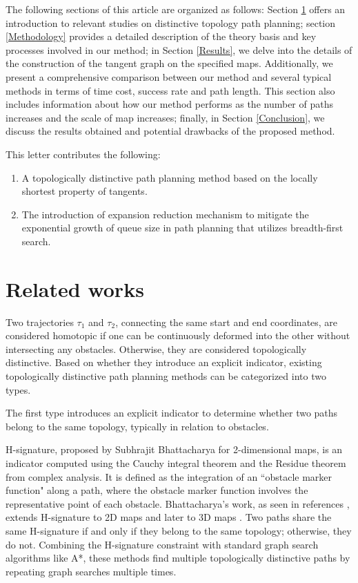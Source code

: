 \documentclass[lettersize,journal]{IEEEtran}
\begin{document}
The following sections of this article are organized as follows: Section \ref{RelatedWork} offers an introduction to relevant studies on distinctive topology path planning; section \ref{Methodology} provides a detailed description of the theory basis and key processes involved in our method; in Section \ref{Results}, we delve into the details of the construction of the tangent graph on the specified maps. Additionally, we present a comprehensive comparison between our method and several typical methods in terms of time cost, success rate and path length. This section also includes information about how our method performs as the number of paths increases and the scale of map increases; finally, in Section \ref{Conclusion}, we discuss the results obtained and potential drawbacks of the proposed method.

This letter contributes the following:

\begin{enumerate}
    \item A topologically distinctive path planning method based on the locally shortest property of tangents.
    \item The introduction of expansion reduction mechanism to mitigate the exponential growth of queue size in path planning that utilizes breadth-first search.
\end{enumerate}

\section{Related works}
\label{RelatedWork}

Two trajectories $\tau_1$ and $\tau_2$, connecting the same start and end coordinates, are considered homotopic if one can be continuously deformed into the other without intersecting any obstacles. Otherwise, they are considered topologically distinctive. Based on whether they introduce an explicit indicator, existing topologically distinctive path planning methods can be categorized into two types.

The first type introduces an explicit indicator to determine whether two paths belong to the same topology, typically in relation to obstacles.

H-signature, proposed by Subhrajit Bhattacharya for 2-dimensional maps, is an indicator computed using the Cauchy integral theorem and the Residue theorem from complex analysis. It is defined as the integration of an ``obstacle marker function" along a path, where the obstacle marker function involves the representative point of each obstacle. Bhattacharya's work, as seen in references \cite{bhattacharya2010search, kim2012optimal, bhattacharya2012topological}, extends H-signature to 2D maps and later to 3D maps \cite{bhattacharya2012search}. Two paths share the same H-signature if and only if they belong to the same topology; otherwise, they do not. Combining the H-signature constraint with standard graph search algorithms like A*, these methods find multiple topologically distinctive paths by repeating graph searches multiple times. 
\end{document}
